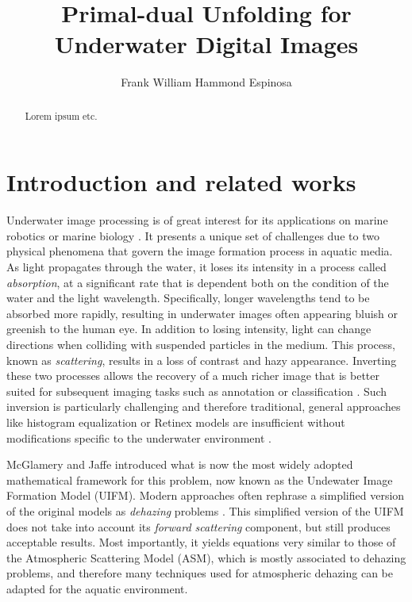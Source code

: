 \documentclass[twocolumn,twoside,a4paper,10pt]{IEEEtran}
\title{Primal-dual Unfolding for\\ Underwater Digital Images}
\author{Frank William Hammond Espinosa}
\begin{document}

\maketitle



\begin{abstract}
\noindent Lorem ipsum etc.
\end{abstract}
\section{Introduction and related works}

Underwater image processing is of great interest for its applications on marine robotics \cite{956031} or marine biology \cite{4099139}. It presents a unique set of challenges due to two
physical phenomena that govern the image formation process in aquatic media. As light propagates through the water, it loses its intensity in a process called \textit{absorption}, at a significant rate that is dependent both on the condition of the water and the light
wavelength. Specifically, longer wavelengths tend to be absorbed more rapidly, resulting in underwater images often appearing bluish or greenish to the human eye. In addition to losing intensity, light can change directions when colliding with
suspended particles in the medium. This process, known as \textit{scattering}, results in a loss of contrast and hazy appearance. Inverting these two processes
allows the recovery of a much richer image that is better suited for subsequent imaging tasks such as annotation \cite{lisani2022analysis} or classification \cite{1707999}. Such inversion is particularly challenging and therefore traditional, general approaches like
histogram equalization or Retinex models are insufficient without modifications
specific to the underwater environment \cite{xie2021variational}.

McGlamery \cite{10.1117/12.958279} and Jaffe \cite{50695} introduced what is now the most widely adopted mathematical framework for this problem, now known as the
Undewater Image Formation Model (UIFM). Modern approaches often rephrase a simplified version of the original models as \textit{dehazing} problems \cite{GALDRAN2015132}. This simplified version of the UIFM does not take into account its \textit{forward scattering} component, but still produces acceptable results. Most importantly, it yields equations very similar to those of the Atmospheric Scattering Model (ASM), which is mostly associated to dehazing problems, and therefore many techniques
used for atmospheric dehazing can be adapted for the aquatic environment.
\end{document}
